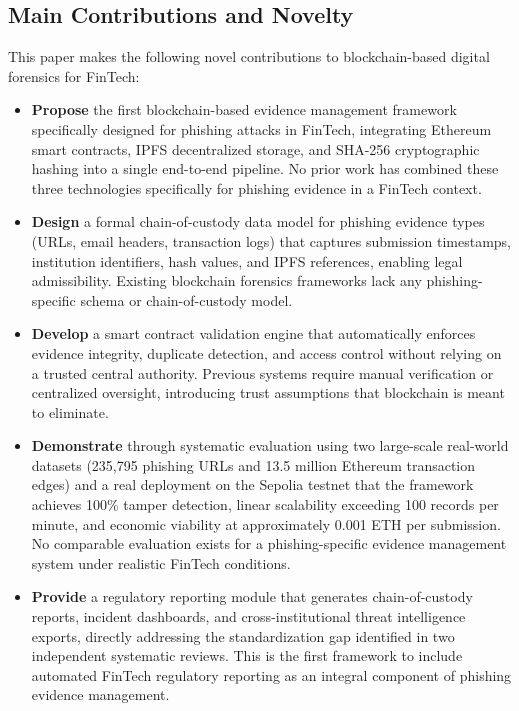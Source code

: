 \documentclass[conference]{IEEEtran}
\begin{document}
\subsection*{Main Contributions and Novelty}
This paper makes the following novel contributions to blockchain-based digital forensics for FinTech:

\begin{itemize}
    \item \textbf{Propose} the first blockchain-based evidence management framework specifically designed for phishing attacks in FinTech, integrating Ethereum smart contracts, IPFS decentralized storage, and SHA-256 cryptographic hashing into a single end-to-end pipeline. No prior work has combined these three technologies specifically for phishing evidence in a FinTech context.
    
    \item \textbf{Design} a formal chain-of-custody data model for phishing evidence types (URLs, email headers, transaction logs) that captures submission timestamps, institution identifiers, hash values, and IPFS references, enabling legal admissibility. Existing blockchain forensics frameworks lack any phishing-specific schema or chain-of-custody model.
    
    \item \textbf{Develop} a smart contract validation engine that automatically enforces evidence integrity, duplicate detection, and access control without relying on a trusted central authority. Previous systems require manual verification or centralized oversight, introducing trust assumptions that blockchain is meant to eliminate.
    
    \item \textbf{Demonstrate} through systematic evaluation using two large-scale real-world datasets (235,795 phishing URLs and 13.5 million Ethereum transaction edges) and a real deployment on the Sepolia testnet that the framework achieves 100\% tamper detection, linear scalability exceeding 100 records per minute, and economic viability at approximately 0.001 ETH per submission. No comparable evaluation exists for a phishing-specific evidence management system under realistic FinTech conditions.
    
    \item \textbf{Provide} a regulatory reporting module that generates chain-of-custody reports, incident dashboards, and cross-institutional threat intelligence exports, directly addressing the standardization gap identified in two independent systematic reviews. This is the first framework to include automated FinTech regulatory reporting as an integral component of phishing evidence management.
\end{itemize}
\end{document}
